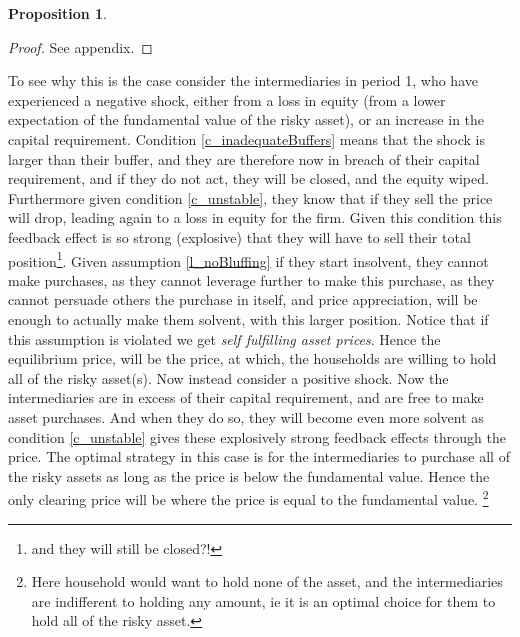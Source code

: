 \documentclass[11pt]{article}
\newtheorem{proposition}{Proposition}
\begin{document}
\begin{appendices}
\begin{proposition}
\end{proposition}
\begin{proof}
See appendix.
\end{proof}

To see why this is the case consider the intermediaries in period 1, who have experienced a negative shock, either from a loss in equity (from a lower expectation of the fundamental value of the risky asset), or an increase in the capital requirement. Condition \ref{c_inadequateBuffers} means that the shock is larger than their buffer, and they are therefore now in breach of their capital requirement, and if they do not act, they will be closed, and the equity wiped. Furthermore given condition \ref{c_unstable}, they know that if they sell the price will drop, leading again to a loss in equity for the firm. Given this condition this feedback effect is so strong (explosive) that they will have to sell their total position\footnote{and they will still be closed?!}. Given assumption \ref{l_noBluffing} if they start insolvent, they cannot make purchases, as they cannot leverage further to make this purchase, as they cannot persuade others the purchase in itself, and price appreciation, will be enough to actually make them solvent, with this larger position. Notice that if this assumption is violated we get \textit{self fulfilling asset prices}. Hence the equilibrium price, will be the price, at which, the households are willing to hold all of the risky asset(s). Now instead consider a positive shock. Now the intermediaries are in excess of their capital requirement, and are free to make asset purchases. And when they do so, they will become even more solvent as condition \ref{c_unstable} gives these explosively strong feedback effects through the price. The optimal strategy in this case is for the intermediaries to purchase all of the risky assets as long as the price is below the fundamental value. Hence the only clearing price will be where the price is equal to the fundamental value. \footnote{Here household would want to hold none of the asset, and the intermediaries are indifferent to holding any amount, ie it is an optimal choice for them to hold all of the risky asset.}


\end{appendices}
\end{document}
